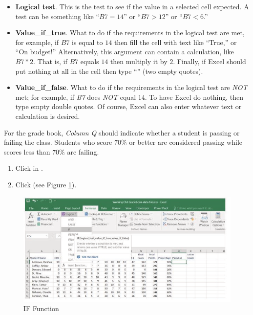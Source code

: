 \begin{itemize}
	\item \textbf{Logical test}. This is the test to see if the value in a selected cell expected. A test can be something like ``$ B7=14 $'' or ``$ B7>12 $'' or ``$ B7<6 $.''
	\item \textbf{Value\_if\_true}. What to do if the requirements in the logical test are met, for example, if $ B7 $ is equal to $ 14 $ then fill the cell with text like ``True,'' or ``On budget!'' Alternatively, this argument can contain a calculation, like $ B7*2 $. That is, if $ B7 $ equals $ 14 $ then multiply it by $ 2 $. Finally, if Excel should put nothing at all in the cell then type ``'' (two empty quotes).
	\item \textbf{Value\_if\_false}. What to do if the requirements in the logical test are \textit{NOT} met; for example, if \textit{B7} does \textit{NOT} equal $ 14 $. To have Excel do nothing, then type empty double quotes. Of course, Excel can also enter whatever text or calculation is desired.
\end{itemize}

For the grade book, \textit{Column Q} should indicate whether a student is passing or failing the class. Students who score $ 70\% $ or better are considered passing while scores less than $ 70\% $ are failing.

\begin{enumbox}
	\begin{enumerate}
		\item Click in .
		\item Click  (see Figure \ref{03:fig09}).
	\end{enumerate}
\end{enumbox}
	
\begin{figure}[H]
	\centering
	\includegraphics[width=\maxwidth{.95\linewidth}]{gfx/ch03_fig09}
	\caption{IF Function}
	\label{03:fig09}
\end{figure}


